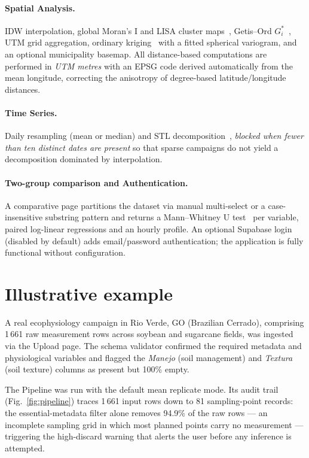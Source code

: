 \documentclass[preprint,12pt,a4paper]{elsarticle}
\begin{document}
\paragraph{Spatial Analysis.} IDW interpolation, global Moran's I and LISA cluster maps~\cite{Anselin1995}, Getis--Ord $G_i^*$~\cite{Getis1992}, UTM grid aggregation, ordinary kriging~\cite{Cressie1993} with a fitted spherical variogram, and an optional municipality basemap. All distance-based computations are performed in \emph{UTM metres} with an EPSG code derived automatically from the mean longitude, correcting the anisotropy of degree-based latitude/longitude distances.

\paragraph{Time Series.} Daily resampling (mean or median) and STL decomposition~\cite{Cleveland1990STL}, \emph{blocked when fewer than ten distinct dates are present} so that sparse campaigns do not yield a decomposition dominated by interpolation.

\paragraph{Two-group comparison and Authentication.} A comparative page partitions the dataset via manual multi-select or a case-insensitive substring pattern and returns a Mann--Whitney U test~\cite{Mann1947} per variable, paired log-linear regressions and an hourly profile. An optional Supabase login (disabled by default) adds email/password authentication; the application is fully functional without configuration.

\section{Illustrative example}\label{sec:examples}

A real ecophysiology campaign in Rio Verde, GO (Brazilian Cerrado), comprising 1\,661 raw measurement rows across soybean and sugarcane fields, was ingested via the Upload page. The schema validator confirmed the required metadata and physiological variables and flagged the \emph{Manejo} (soil management) and \emph{Textura} (soil texture) columns as present but 100\% empty.

The Pipeline was run with the default mean replicate mode. Its audit trail (Fig.~\ref{fig:pipeline}) traces 1\,661 input rows down to 81 sampling-point records: the essential-metadata filter alone removes 94.9\% of the raw rows --- an incomplete sampling grid in which most planned points carry no measurement --- triggering the high-discard warning that alerts the user before any inference is attempted.
\end{document}
